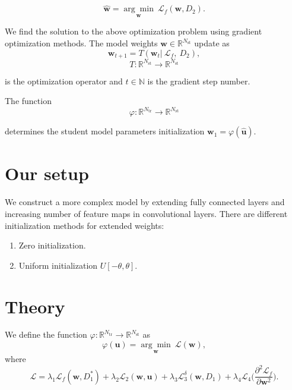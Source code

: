 \documentclass[80pt]{article}
\begin{document}
$$\hat{\mathbf{w}} =  \underset{\mathbf{w}}{\arg\min}~\mathcal{L}_f(\mathbf{w}, D_2).$$

We find the solution to the above optimization problem using gradient optimization methods. The model weights $\mathbf{w} \in \mathbb{R}^{N_{\text{st}}}$ update as
\[\mathbf{w}_{t+1} = T(\mathbf{w}_t |~\mathcal{L}_f,~D_2),\]
\[T: \mathbb{R}^{N_\text{st}} \rightarrow \mathbb{R}^{N_\text{st}}\]

is the optimization operator and $t \in \mathbb{N}$ is the gradient step number.

The function 
\[\varphi: \mathbb{R}^{N_\text{tr}} \rightarrow \mathbb{R}^{N_\text{st}}\]

determines the student model parameters initialization $\mathbf{w}_1 = \varphi(\hat{\mathbf{u}})$.

\section{Our setup}
\label{sec:setup}

We construct a more complex model by extending fully connected layers and increasing number of feature maps in convolutional layers. There are different initialization methods for extended weights:

\begin{enumerate}
    \item Zero initialization.
    \item Uniform initialization $U[-\theta, \theta]$.
\end{enumerate}

\section{Theory}

We define the function $\varphi: \mathbb{R}^{N_\text{tr}} \rightarrow \mathbb{R}^{N_\text{st}}$ as
$$\varphi(\mathbf{u}) = \underset{\mathbf{w}}{\arg\min}~\mathcal{L}(\mathbf{w}),$$
where \[\mathcal{L} = \lambda_1 \mathcal{L}_f(\mathbf{w}, D_1^*) + \lambda_2 \mathcal{L}_2 (\mathbf{w}, \mathbf{u}) + \lambda_3 \mathcal{L}_3^\delta (\mathbf{w}, D_1) + \lambda_4 \mathcal{L}_4 \bigl(\displaystyle \frac{\partial^2 \mathcal{L}_f}{\partial \mathbf{w}^2}\bigr).\]
\end{document}
